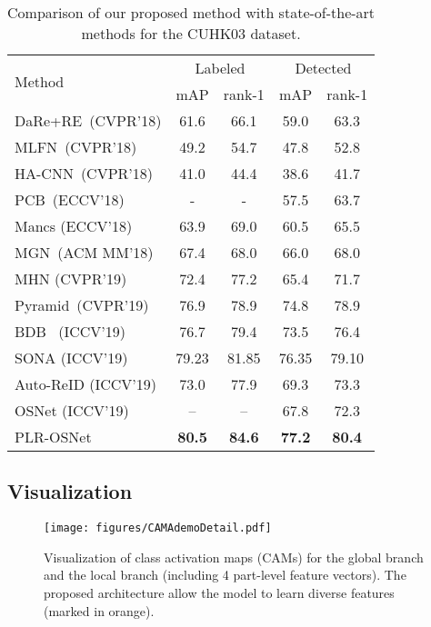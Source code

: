 \documentclass[journal]{IEEEtran}
\begin{document}
\begin{table}
\begin{center}
\begin{tabular}{l|c@{\hskip 5pt}c@{\hskip 5pt}|c@{\hskip 5pt}c@{\hskip 5pt}}
\toprule[1.5pt]
\multirow{2}{*}{Method}	&	\multicolumn{2}{c|}{Labeled}	&			\multicolumn{2}{c}{Detected}			\\
\cline{2-5}
	&	mAP 	&	rank-1	&	mAP 	&	rank-1	\\
\hline
DaRe+RE~\cite{wang2018resource}(CVPR'18)	&	61.6 	&	66.1	&	59.0	&	63.3 \\
MLFN~\cite{chang2018MFN}(CVPR'18)	&	49.2 	&	54.7	&	47.8	&	52.8	\\
HA-CNN~\cite{li2018harmonious}(CVPR'18)	&	41.0 	&	44.4	&	38.6	&	41.7	\\
PCB~\cite{sun2018beyond}(ECCV'18) &    -   &   -   &	57.5	&	63.7	\\
Mancs (ECCV'18)                   & 63.9    & 69.0  &   60.5    &   65.5    \\
MGN~\cite{wang2018MGN}(ACM MM'18)	&	67.4 	&	68.0 	&	66.0 	&	68.0 	\\
MHN \cite{chen2019MHN} (CVPR'19)   &72.4    & 77.2 & 65.4 & 71.7 \\
Pyramid~\cite{zheng2019pyramid}(CVPR'19)	&	76.9	&	78.9	&	74.8	&	78.9	\\
BDB~\cite{dai2019BDB} (ICCV'19)	&	76.7	&	79.4	&	73.5	&	76.4	\\
SONA \cite{xia2019SONA} (ICCV'19)       & 79.23 & 81.85 & 76.35 & 79.10   \\
Auto-ReID \cite{quan2019Auto} (ICCV'19)                     & 73.0  & 77.9  & 69.3 & 73.3 \\
OSNet \cite{zhou2019OSNet} (ICCV'19)                 & --        & --        &   67.8    &   72.3 \\ \hline
PLR-OSNet 	& \bf80.5	&	\bf84.6	& \bf77.2	& \bf80.4	\\
\bottomrule[1.5pt]
\end{tabular}
\end{center}
\caption{Comparison of our proposed method with state-of-the-art methods for the CUHK03 dataset.}
\label{tbl:CUHK03}
\end{table}


\subsection{Visualization}
\begin{figure}[t]
\centering
\texttt{[image: figures/CAMAdemoDetail.pdf]}
\caption{Visualization of class activation maps (CAMs) for the global branch and  the local branch (including 4 part-level feature vectors). The proposed architecture allow the model to learn diverse features (marked in orange).}
\label{fig:demDetail}
\end{figure}
\end{document}
